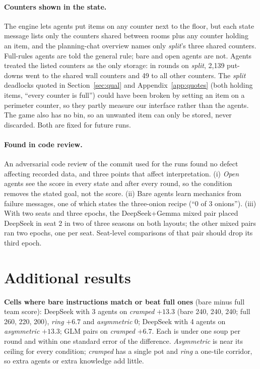 \documentclass{article}
\begin{document}
\paragraph{Counters shown in the state.} The engine lets agents put items on any counter next to the floor, but each state message lists only the counters shared between rooms plus any counter holding an item, and the planning-chat overview names only \emph{split}'s three shared counters. Full-rules agents are told the general rule; bare and open agents are not. Agents treated the listed counters as the only storage: in rounds on \emph{split}, 2{,}139 put-downs went to the shared wall counters and 49 to all other counters. The \emph{split} deadlocks quoted in Section~\ref{sec:qual} and Appendix~\ref{app:quotes} (both holding items, ``every counter is full'') could have been broken by setting an item on a perimeter counter, so they partly measure our interface rather than the agents. The game also has no bin, so an unwanted item can only be stored, never discarded. Both are fixed for future runs.

\paragraph{Found in code review.}
An adversarial code review of the commit used for the runs found no defect affecting recorded data, and three points that affect interpretation. (i) \emph{Open} agents see the score in every state and after every round, so the condition removes the stated goal, not the score. (ii) Bare agents learn mechanics from failure messages, one of which states the three-onion recipe (``0 of 3 onions''). (iii) With two seats and three epochs, the DeepSeek+Gemma mixed pair placed DeepSeek in seat 2 in two of three seasons on both layouts; the other mixed pairs ran two epochs, one per seat. Seat-level comparisons of that pair should drop its third epoch.


\section{Additional results}\label{app:more}
\textbf{Cells where bare instructions match or beat full ones} (bare minus full team score): DeepSeek with 3 agents on \emph{cramped} $+13.3$ (bare 240, 240, 240; full 260, 220, 200), \emph{ring} $+6.7$ and \emph{asymmetric} $0$; DeepSeek with 4 agents on \emph{asymmetric} $+13.3$; GLM pairs on \emph{cramped} $+6.7$. Each is under one soup per round and within one standard error of the difference. \emph{Asymmetric} is near its ceiling for every condition; \emph{cramped} has a single pot and \emph{ring} a one-tile corridor, so extra agents or extra knowledge add little.
\end{document}
